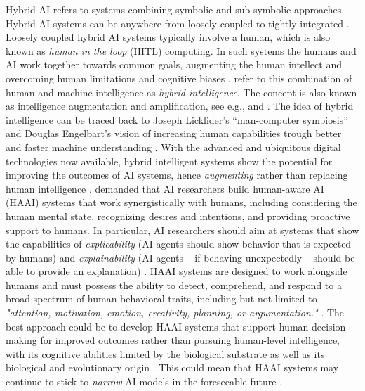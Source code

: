 Hybrid AI refers to systems combining symbolic and sub-symbolic
approaches. Hybrid AI systems can be anywhere from loosely coupled to tightly integrated \citep{garcezNeurosymbolicAI3rd2023}.
Loosely coupled hybrid AI systems typically involve a human, which is also known as \textit{human in the loop} (HITL)
computing. In such systems the humans and AI work together towards common goals, augmenting the human intellect and
overcoming human limitations and cognitive biases \citep{akataResearchAgendaHybrid2020}. \cite{akataResearchAgendaHybrid2020}
refer to this combination of human and machine intelligence as \textit{hybrid intelligence}. The concept is also known as
intelligence augmentation and amplification, see e.g., \cite{schmidtAugmentingHumanIntellect2017} and
\cite{zhouIntelligenceAugmentationBuilding2021}. The idea of hybrid intelligence can be traced back to Joseph Licklider's
``man-computer symbiosis'' and Douglas Engelbart's vision of increasing human capabilities trough better and faster machine
understanding \citep[and references cited therein]{schmidtAugmentingHumanIntellect2017}. With the advanced and ubiquitous
digital technologies now available, hybrid intelligent systems show the potential for improving the outcomes of AI systems, 
hence \textit{augmenting} rather than replacing human intelligence \citep{schmidtAugmentingHumanIntellect2017,akataResearchAgendaHybrid2020}.
\cite{kambhampatiChallengesHumanAwareAI2020} demanded that AI researchers build human-aware AI (HAAI) systems that work
synergistically with humans, including considering the human mental state, recognizing desires and intentions, and providing
proactive support to humans. In particular, AI researchers should aim at systems that show the capabilities of
\textit{explicability} (AI agents should show behavior that is expected by humans) and \textit{explainability} (AI agents -- 
if behaving unexpectedly -- should be able to provide an explanation) \citep{kambhampatiChallengesHumanAwareAI2020}.
HAAI systems are designed to work alongside humans and must possess the ability to detect, comprehend, and respond to a
broad spectrum of human behavioral traits, including but not limited to \textit{"attention, motivation, emotion, creativity,
planning, or argumentation."} \citep{kortelingHumanArtificialIntelligence2021}. The best approach could be to develop HAAI
systems that support human decision-making for improved outcomes rather than pursuing human-level intelligence, with its
cognitive abilities limited by the biological substrate as well as its biological and evolutionary origin
\citep{kortelingHumanArtificialIntelligence2021}. This could mean that HAAI systems may continue to stick to \textit{narrow}
AI models in the foreseeable future \citep{kortelingHumanArtificialIntelligence2021}.

